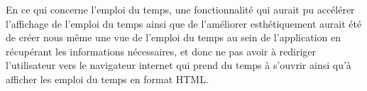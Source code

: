 En ce qui concerne l’emploi du temps, une fonctionnalité qui aurait pu accélérer l’affichage de l’emploi du temps ainsi que de l’améliorer esthétiquement aurait été de créer nous même une vue de l’emploi du temps au sein de l’application en récupérant les informations nécessaires, et donc ne pas avoir à rediriger l’utilisateur vers le navigateur internet qui prend du temps à s’ouvrir ainsi qu’à afficher les emploi du temps en format HTML.\\